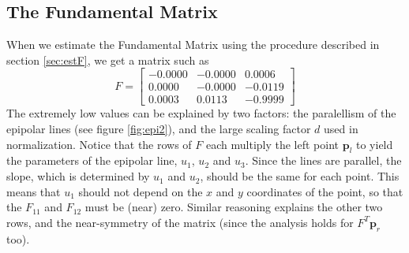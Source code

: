 \documentclass[a4paper,10pt]{article}
\begin{document}
\subsection{The Fundamental Matrix}
When we estimate the Fundamental Matrix using the procedure described in section \ref{sec:estF}, we get a matrix such as
\begin{equation}
F = \begin{bmatrix}
-0.0000 & -0.0000 & 0.0006 \\
0.0000 & -0.0000 & -0.0119 \\
0.0003 & 0.0113 & -0.9999
\end{bmatrix}
\end{equation}
The extremely low values can be explained by two factors: the paralellism of the epipolar lines (see figure \ref{fig:epi2}), and the large scaling factor $d$ used in normalization.
Notice that the rows of $F$ each multiply the left point $\mathbf{p}_l$ to yield the parameters of the epipolar line, $u_1$, $u_2$ and $u_3$.
Since the lines are parallel, the slope, which is determined by $u_1$ and $u_2$, should be the same for each point.
This means that $u_1$ should not depend on the $x$ and $y$ coordinates of the point, so that the $F_{11}$ and $F_{12}$ must be (near) zero.
Similar reasoning explains the other two rows, and the near-symmetry of the matrix (since the analysis holds for $F^T \mathbf{p}_r$ too).



{}

\end{document}
